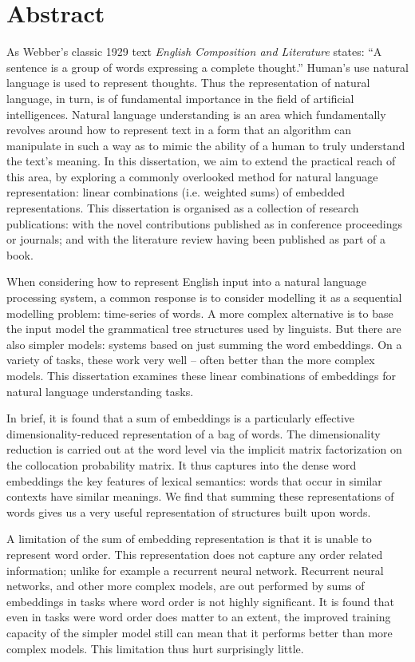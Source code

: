 \documentclass{book}
\begin{document}
\chapter*{Abstract}
As Webber's classic 1929 text \textit{English Composition and Literature} states:
``A sentence is a group of words expressing a complete thought.''
Human's use natural language is used to represent thoughts.
Thus the representation of natural language, in turn, is of fundamental importance in the field of artificial intelligences.
Natural language understanding is an area which fundamentally revolves around how to represent text in a form that an algorithm can manipulate in such a way as to mimic the ability of a human to truly understand the text's meaning.
In this dissertation, we aim to extend the practical reach of this area,
by exploring a commonly overlooked method for natural language representation: linear combinations (i.e. weighted sums) of embedded representations.
This dissertation is organised as a collection of research publications: with the novel contributions published as in conference proceedings or journals; and with the literature review having been published as part of a book.

When considering how to represent English input into a natural language processing system,
a common response is to consider modelling it as a sequential modelling problem: time-series of words.
A more complex alternative is to base the input model the grammatical tree structures used by linguists.
But there are also simpler models: systems based on just summing the word embeddings.
On a variety of tasks, these work very well -- often better than the more complex models.
This dissertation examines these linear combinations of embeddings for natural language understanding tasks.

In brief, it is found that a sum of embeddings is a particularly effective dimensionality-reduced representation of a bag of words.
The dimensionality reduction is carried out at the word level via the implicit matrix factorization 
on the collocation probability matrix.
It thus captures into the dense word embeddings the key features of lexical semantics:
words that occur in similar contexts have similar meanings.
We find that summing these representations of words gives us a very useful representation of structures built upon words.

A limitation of the sum of embedding representation is that it is unable to represent word order.
This representation does not capture any order related information; unlike for example a recurrent neural network.
Recurrent neural networks, and other more complex models, are out performed by sums of embeddings in tasks where word order is not highly significant.
It is found that even in tasks were word order does matter to an extent, the improved training capacity of the simpler model still can mean that it performs better than more complex models.
This limitation thus hurt surprisingly little.
\end{document}
